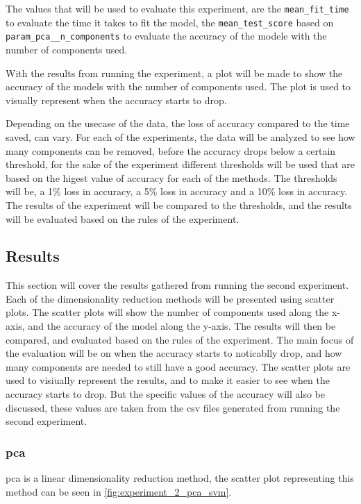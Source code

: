 The values that will be used to evaluate this experiment, are the \texttt{mean\_fit\_time} to evaluate the time it takes to fit the model, the \texttt{mean\_test\_score} based on \texttt{param\_pca\_\_n\_components} to evaluate the accuracy of the modele with the number of components used.

With the results from running the experiment, a plot will be made to show the accuracy of the models with the number of components used. The plot is used to visually represent when the accuracy starts to drop. 

Depending on the usecase of the data, the loss of accuracy compared to the time saved, can vary. For each of the experiments, the data will be analyzed to see how many components can be removed, before the accuracy drops below a certain threshold, for the sake of the experiment different thresholds will be used that are based on the higest value of accuracy for each of the methods. The thresholds will be, a 1\% loss in accuracy, a 5\% loss in accuracy and a 10\% loss in accuracy. The results of the experiment will be compared to the thresholds, and the results will be evaluated based on the rules of the experiment.


\subsection{Results}\label{subsec:experiment_2_results}
This section will cover the results gathered from running the second experiment. Each of the dimensionality reduction methods will be presented using scatter plots. The scatter plots will show the number of components used along the x-axis, and the accuracy of the model along the y-axis. The results will then be compared, and evaluated based on the rules of the experiment. The main focus of the evaluation will be on when the accuracy starts to noticablly drop, and how many components are needed to still have a good accuracy. The scatter plots are used to visiually represent the results, and to make it easier to see when the accuracy starts to drop. But the specific values of the accuracy will also be discussed, these values are taken from the csv files generated from running the second experiment. 

\subsubsection{\gls{pca}}\label{subsubsec:experiment_2_pca}
\gls{pca} is a linear dimensionality reduction method, the scatter plot representing this method can be seen in \autoref{fig:experiment_2_pca_svm}. 

